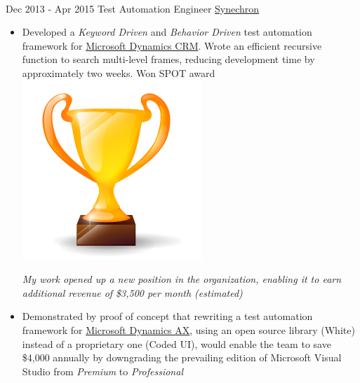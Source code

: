 \documentclass[letterpaper]{twentysecondcv} %
\begin{document}
\begin{twenty}
     \\
     \twentyitem
   		{Dec 2013 -}
		{Apr 2015}
        {Test Automation Engineer}
        {\href{http://www.synechron.com/}{Synechron}}
        {}
        {
        \begin{itemize}
        \item Developed a \textit{Keyword Driven} and \textit{Behavior Driven} test automation framework for \href{https://www.microsoft.com/en-ca/dynamics/crm.aspx}{Microsoft Dynamics CRM}. Wrote an efficient recursive function to search multi-level frames, reducing development time by approximately two weeks. Won SPOT award {\includegraphics[scale=0.05]{img/trophy.png}}
        
        \textit{My work opened up a new position in the organization, enabling it to earn additional revenue of \$3,500 per month (estimated)}
        \item Demonstrated by proof of concept that rewriting a test automation framework for \href{https://www.microsoft.com/en-ca/dynamics/erp-ax-overview.aspx}{Microsoft Dynamics AX}, using an open source library (White) instead of a proprietary one (Coded UI), would enable the team to save \$4,000 annually by downgrading the prevailing edition of Microsoft Visual Studio from \textit{Premium} to \textit{Professional}
    \end{itemize}
    	}
        
\end{twenty}
\end{document}
